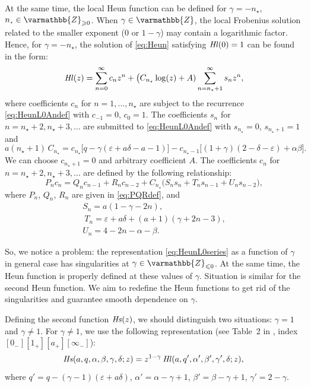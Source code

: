 \documentclass[11pt]{article}
\newcommand{\MF}[1]{\mathop{\mbox{$#1$}}\nolimits}
\newcommand{\Zz}{\varmathbb{Z}}%
\newcommand{\Zzp}{\varmathbb{Z}_{\geqslant0}}%
\newcommand{\Zzm}{\varmathbb{Z}_{\leqslant0}}%
\def\HeunL{\MF{\textit{Hl\/}}}%
\def\HeunS{\MF{\textit{Hs\/}}}%
\def\nst{n_{\scriptscriptstyle\star}}
\begin{document}
At the same time, the local Heun function can be defined for $\gamma=-\nst$, $\nst\in\Zzp$. When $\gamma\in\Zz$, the local Frobenius solution related to the smaller exponent ($0$ or $1-\gamma$) may contain a logarithmic factor. 
Hence, for $\gamma=-\nst$, the
solution of \eqref{eq:Heun} satisfying $\HeunL(0)=1$ can be found in the form:
\begin{equation}
\HeunL(z)=\sum_{n=0}^{\infty}c_n
z^n +\bigl(C_{\nst}\log(z)+A)
\sum_{n=\nst+1}^{\infty}s_n z^n,
\label{eq:HeunLserieslog}
\end{equation}
where coefficients $c_n$ for $n=1,\ldots,\nst$
are subject to the recurrence \eqref{eq:HeunL0Andef} with  \mbox{$c_{-1}=0$}, $c_0=1$. The coefficients $s_n$ for
$n=\nst+2,\nst+3,\ldots$ are submitted to 
\eqref{eq:HeunL0Andef} with $s_{\nst}=0$, $s_{\nst+1}=1$ and
\begin{equation}
a(\nst+1)\, C_{\nst}=c_{\nst}\bigl[q-\gamma(\varepsilon+a\delta-a-1)\bigr]-
c_{\nst-1}\bigl[(1+\gamma)(2-\delta-\varepsilon)+\alpha\beta\bigr].\label{eq:Cst}
\end{equation}
We can choose $c_{\nst+1}=0$ and arbitrary coefficient $A$. The coefficients $c_n$ for $n=\nst+2,\nst+3,\ldots$
are defined by the following relationship:
\begin{equation*}
P_n c_n=Q_n c_{n-1}+R_n c_{n-2}+ C_{\nst}\bigl(S_n s_{n}+T_n s_{n-1}+U_n s_{n-2}\bigr),
\label{eq:recurrlog}
\end{equation*}
where $P_n$, $Q_n$, $R_n$ are given in \eqref{eq:PQRdef}, and
\begin{equation}
\begin{gathered}
S_n = a(1-\gamma-2n),\\\
T_n = \varepsilon+a\delta+(a+1)(\gamma+2n-3),\\
U_n = 4-2n-\alpha-\beta.
\end{gathered}
\label{eq:STUdef}
\end{equation}

So, we notice a problem: the representation \eqref{eq:HeunL0series} as a function of $\gamma$ in general case has singularities at $\gamma\in\Zzm$. At the same time, the Heun function is properly defined at these values of $\gamma$. Situation is similar for the second Heun function. We aim to redefine the Heun functions to get rid of the singularities and guarantee smooth dependence on $\gamma$. 

Defining the second function $\HeunS(z)$, we should
distinguish two situations: $\gamma=1$ and $\gamma\neq1$. For
$\gamma\neq1$, we use the following representation (see Table~2 in
\cite{192-Maier2007}, index $[0_-][1_+][a_+][\infty_-]$):
\begin{equation}
 \!\HeunS(a,q,\alpha,\beta,\gamma,\delta;z) \\{}= z^{1-\gamma}\HeunL(a,q',\alpha',\beta',\gamma',\delta;z),
\label{eq:HeunSgammaneq1}
\end{equation}
where $q'=q-(\gamma-1)(\varepsilon+a\delta)$, $\alpha'=\alpha-\gamma+1$,
$\beta'=\beta-\gamma+1$, $\gamma'=2-\gamma$.
\end{document}
